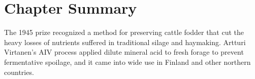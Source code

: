 \clearpage

\section*{Chapter Summary}

The 1945 prize recognized a method for preserving cattle fodder that cut the heavy losses of nutrients suffered in traditional silage and haymaking. Artturi Virtanen's AIV process applied dilute mineral acid to fresh forage to prevent fermentative spoilage, and it came into wide use in Finland and other northern countries.
